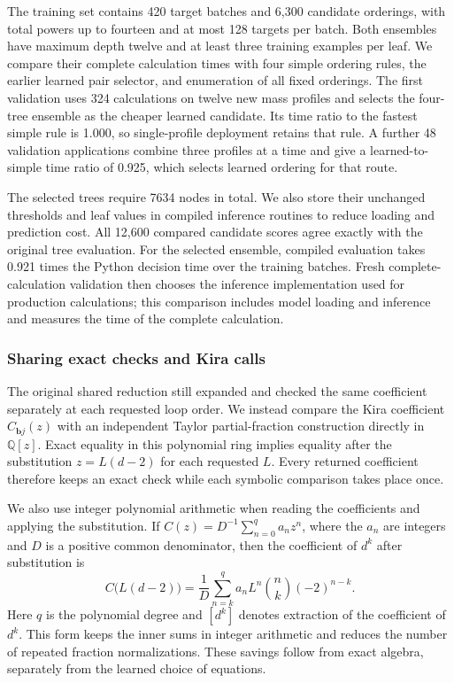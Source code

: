The training set contains 420 target batches and 6,300 candidate orderings,
with total powers up to fourteen and at most 128 targets per batch.
Both ensembles have maximum depth twelve and at least three training
examples per leaf. We compare their complete calculation times with
four simple ordering rules, the earlier learned pair selector, and
enumeration of all fixed orderings. The first validation uses 324
calculations on twelve new mass profiles and selects the four-tree
ensemble as the cheaper learned candidate. Its time ratio to the
fastest simple rule is 1.000, so single-profile deployment
retains that rule. A further 48 validation applications combine three
profiles at a time and give a learned-to-simple time ratio of
0.925, which selects learned ordering for that route.

The selected trees require 7634 nodes in total. We also store their
unchanged thresholds and leaf values in compiled inference routines to
reduce loading and prediction cost. All 12,600 compared candidate scores
agree exactly with the original tree evaluation. For the selected
ensemble, compiled evaluation takes 0.921 times the Python
decision time over the training batches. Fresh complete-calculation
validation then chooses the inference implementation used for production calculations; this comparison includes
model loading and inference and measures the time of the complete calculation.

\subsubsection{Sharing exact checks and Kira calls}
The original shared reduction still expanded and checked the same
coefficient separately at each requested loop order. We instead compare
the Kira coefficient \(C_{\boldsymbol b j}(z)\) with an independent
Taylor partial-fraction construction directly in \(\mathbb Q[z]\).
Exact equality in this polynomial ring implies equality after the
substitution \(z=L(d-2)\) for each requested \(L\). Every returned
coefficient therefore keeps an exact check while each symbolic comparison
takes place once.

We also use integer polynomial arithmetic when reading the coefficients
and applying the substitution. If
\(C(z)=D^{-1}\sum_{n=0}^{q}a_nz^n\), where the \(a_n\) are integers and
\(D\) is a positive common denominator, then the coefficient of \(d^k\)
after substitution is
\begin{equation}
 [d^k]C\bigl(L(d-2)\bigr)
 =\frac{1}{D}\sum_{n=k}^{q}a_n L^n
   \binom{n}{k}(-2)^{n-k}.
 \label{eq:batch-integer-substitution}
\end{equation}
Here \(q\) is the polynomial degree and \([d^k]\) denotes extraction of
the coefficient of \(d^k\). This form keeps the inner sums in integer
arithmetic and reduces the number of repeated fraction normalizations.
These savings follow from exact algebra, separately from the learned
choice of equations.

